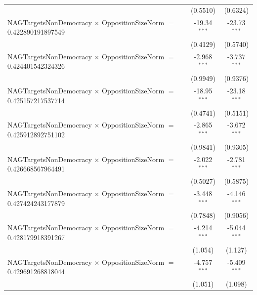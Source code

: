 \begin{tabular}{lcc}
                                                                                & (0.5510)             & (0.6324)\\   
   NAGTargetsNonDemocracy $\times$ OppositionSizeNorm $=$ 0.422890191897549     & -19.34$^{***}$       & -23.73$^{***}$\\   
                                                                                & (0.4129)             & (0.5740)\\   
   NAGTargetsNonDemocracy $\times$ OppositionSizeNorm $=$ 0.424401542324326     & -2.968$^{***}$       & -3.737$^{***}$\\   
                                                                                & (0.9949)             & (0.9376)\\   
   NAGTargetsNonDemocracy $\times$ OppositionSizeNorm $=$ 0.425157217537714     & -18.95$^{***}$       & -23.18$^{***}$\\   
                                                                                & (0.4741)             & (0.5151)\\   
   NAGTargetsNonDemocracy $\times$ OppositionSizeNorm $=$ 0.425912892751102     & -2.865$^{***}$       & -3.672$^{***}$\\   
                                                                                & (0.9841)             & (0.9305)\\   
   NAGTargetsNonDemocracy $\times$ OppositionSizeNorm $=$ 0.426668567964491     & -2.022$^{***}$       & -2.781$^{***}$\\   
                                                                                & (0.5027)             & (0.5875)\\   
   NAGTargetsNonDemocracy $\times$ OppositionSizeNorm $=$ 0.427424243177879     & -3.448$^{***}$       & -4.146$^{***}$\\   
                                                                                & (0.7848)             & (0.9056)\\   
   NAGTargetsNonDemocracy $\times$ OppositionSizeNorm $=$ 0.428179918391267     & -4.214$^{***}$       & -5.044$^{***}$\\   
                                                                                & (1.054)              & (1.127)\\   
   NAGTargetsNonDemocracy $\times$ OppositionSizeNorm $=$ 0.429691268818044     & -4.757$^{***}$       & -5.409$^{***}$\\   
                                                                                & (1.051)              & (1.098)\\   

\end{tabular}
